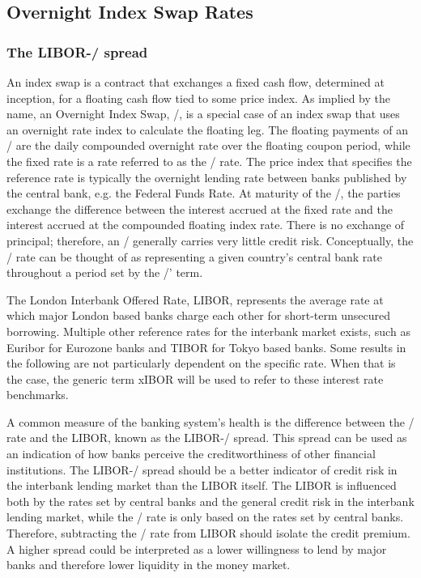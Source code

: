 \documentclass[main.tex]{subfiles}
\begin{document}
    \subsection{Overnight Index Swap Rates}
    
    \subsubsection{The LIBOR-\OIS/ spread}
    An index swap is a contract that exchanges a fixed cash flow, determined at inception,
    for a floating cash flow tied to some price index.
    As implied by the name, an Overnight Index Swap, \OIS/, is a special case of an index swap
    that uses an overnight rate index to calculate the floating leg.
    The floating payments of an \OIS/ are the daily compounded overnight rate 
    over the floating coupon period,
    while the fixed rate is a rate referred to as the \OIS/ rate.
    The price index that specifies the reference rate is typically the overnight 
    lending rate between banks published by the central bank, e.g. the Federal Funds Rate.
    At maturity of the \OIS/, the parties exchange the difference between the interest accrued 
    at the fixed rate and the interest accrued at the compounded floating index rate.
    There is no exchange of principal; 
    therefore, an \OIS/ generally carries very little credit risk. 
    Conceptually, the \OIS/ rate can be thought of as representing a given country's
    central bank rate throughout a period set by the \OIS/' term. 

    The London Interbank Offered Rate, LIBOR, represents the average rate 
    at which major London based banks charge each other for short-term unsecured borrowing.
    Multiple other reference rates for the interbank market exists, 
    such as Euribor for Eurozone banks and TIBOR for Tokyo based banks.
    Some results in the following are not particularly dependent on the specific rate.
    When that is the case, the generic term xIBOR will be used 
    to refer to these interest rate benchmarks.

    A common measure of the banking system's health is the difference between the \OIS/ rate
    and the LIBOR, known as the LIBOR-\OIS/ spread.
    This spread can be used as an indication of how banks perceive the creditworthiness
    of other financial institutions. 
    The LIBOR-\OIS/ spread should be a better indicator of credit risk in the interbank lending market
    than the LIBOR itself. 
    The LIBOR is influenced both by the rates set by central banks and 
    the general credit risk in the interbank lending market,
    while the \OIS/ rate is only based on the rates set by central banks.
    Therefore, subtracting the \OIS/ rate from LIBOR should isolate the credit premium.
    A higher spread could be interpreted as a lower willingness to lend by major banks
    and therefore lower liquidity in the money market.
\end{document}
